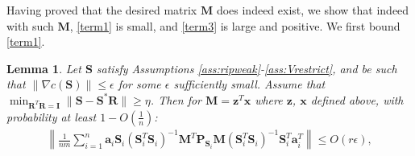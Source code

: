 \documentclass[twoside,11pt]{article}
\newtheorem{lem}{Lemma}
\begin{document}
Having proved that the desired matrix $\bm{M}$ does indeed exist, we   show that indeed with such $\bm{M}$, \ref{term1} is small, and \ref{term3} is large and positive.
We first bound \ref{term1}.
\begin{lem}
	\label{lem:term_1_bound}
	Let $\bm{S}$ satisfy Assumptions \ref{ass:ripweak}-\ref{ass:Vrestrict}, and be such that $\|\nabla c(\bm{S})\|\leq \epsilon$ for some $\epsilon$ sufficiently small. Assume that $\min_{\bm{R}^T\bm{R}=\bm{I}}\|\bm{S}-\bm{S}^*\bm{R}\|\geq \eta$. Then for $\bm{M}=\bm{z}^T\bm{x}$ where $\bm{z}$, $\bm{x}$ defined above, with probability at least $1-O(\frac{1}{n})$:
	\begin{align*}
	\left\|\frac{1}{nm}\sum_{i=1}^n \bm{a}_i\bm{S}_i(\bm{S}_i^T\bm{S}_i)^{-1}\bm{M}^T\bm{P}_{\bm{S}_i}\bm{M} (\bm{S}_i^T\bm{S}_i)^{-1}\bm{S}_i^T\bm{a}_i^T \right\|\leq O(r\epsilon),
	\end{align*}
\end{lem}
\end{document}

